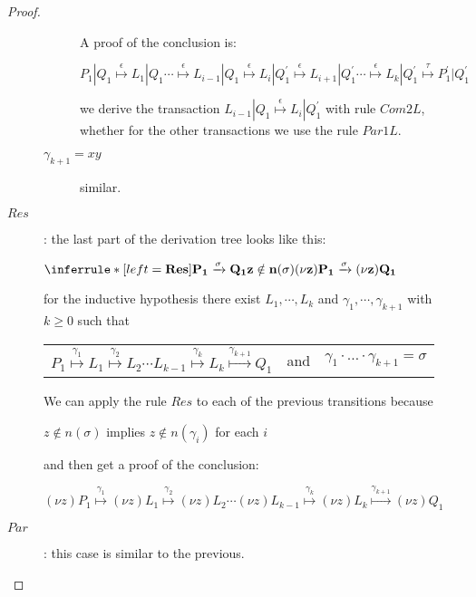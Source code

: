 \begin{proposition}
\begin{proof}
\begin{description}
\begin{description}
	    A proof of the conclusion is:
	    \begin{center}
	      $
		  P_{1}|Q_{1} \stackrel{\epsilon}{\longmapsto} L_{1}|Q_{1} 
		  \cdots
			      \stackrel{\epsilon}{\longmapsto} L_{i-1}|Q_{1} 
			      \stackrel{\epsilon}{\longmapsto} L_{i}|Q_{1}^{'}
			      \stackrel{\epsilon}{\longmapsto} L_{i+1}|Q_{1}^{'}
		  \cdots 
			      \stackrel{\epsilon}{\longmapsto} L_{k}|Q_{1}^{'}
			      \stackrel{\tau}{\longmapsto} P_{1}^{'}|Q_{1}^{'}$	  
	    \end{center}
	    we derive the transaction $ L_{i-1}|Q_{1} \stackrel{\epsilon}{\longmapsto} L_{i}|Q_{1}^{'}$ with rule $Com2L$, whether for the other transactions  we use the rule $Par1L$.
	  \item[$\gamma_{k+1}=xy$] similar.
	\end{description}
      \item[$Res$]: 
	the last part of the derivation tree looks like this:
	\begin{center}
	  $\inferrule* [left=\bf{Res}]{
	      P_{1} \xrightarrow{\sigma} Q_{1}
	    \\
	      z\notin n(\sigma)
	  }{
	    (\nu z) P_{1} \xrightarrow{\sigma} (\nu z) Q_{1}
	  }$
	\end{center}
	for the inductive hypothesis there exist $L_{1}, \cdots, L_{k}$ and $\gamma_{1}, \cdots, \gamma_{k+1}$ with $k\geq 0$ such that 
	\begin{center}
	  \begin{tabular}{lll}
	    $P_{1} \stackrel{\gamma_{1}}{\longmapsto} L_{1}  \stackrel{\gamma_{2}}{\longmapsto} L_{2} \cdots L_{k-1} \stackrel{\gamma_{k}}{\longmapsto} L_{k} \stackrel{\gamma_{k+1}}{\longmapsto} Q_{1}$ 
	  &
	    and
	  &
	    $\gamma_{1} \cdot \ldots \cdot \gamma_{k+1} =  \sigma$
	  \end{tabular}
	\end{center}
	We can apply the rule $Res$ to each of the previous transitions because 
	\begin{center}
	  $z\notin n(\sigma)$ implies $z\notin n(\gamma_{i})$ for each $i$
	\end{center}
	and then get a proof of the conclusion:
	\begin{center}
	  $(\nu z)P_{1} \stackrel{\gamma_{1}}{\longmapsto} (\nu z)L_{1}  \stackrel{\gamma_{2}}{\longmapsto} (\nu z)L_{2} \cdots (\nu z)L_{k-1} \stackrel{\gamma_{k}}{\longmapsto} (\nu z)L_{k} \stackrel{\gamma_{k+1}}{\longmapsto} (\nu z)Q_{1}$
	\end{center}
      \item[$Par$]: this case is similar to the previous.

\end{description}
\end{proof}
\end{proposition}
